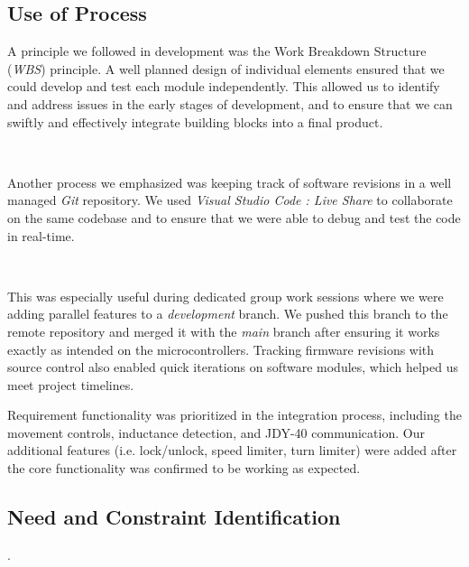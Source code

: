 \documentclass{article}
\begin{document}
\subsection{Use of Process}

A principle we followed in development was the Work Breakdown Structure (\textit{WBS}) principle. A well planned design of individual elements ensured that we could
develop and test each module independently. This allowed us to identify and address issues in the early stages of development, and to
ensure that we can swiftly and effectively integrate building blocks into a final product.

\

Another process we emphasized was keeping track of software revisions in a well managed \textit{Git} repository. We used \textit{Visual Studio Code : Live Share}
to collaborate on the same codebase and to ensure that we were able to debug and test the code in real-time.

\

This was especially useful during dedicated group work sessions where we were adding parallel features to a \textit{development} branch. We pushed this branch to the remote repository
and merged it with the \textit{main} branch after ensuring it works exactly as intended on the microcontrollers. Tracking firmware revisions with source control also enabled quick iterations
on software modules, which helped us meet project timelines.

Requirement functionality was prioritized in the integration process, including the movement controls, inductance detection, and JDY-40 communication.
Our additional features (i.e. lock/unlock, speed limiter, turn limiter) were added after the core functionality was confirmed to be working as expected.

\subsection{Need and Constraint Identification}.
\end{document}
